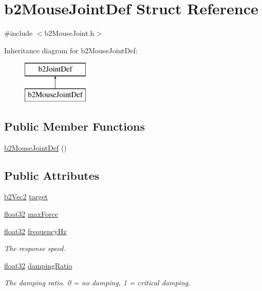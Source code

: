 \hypertarget{structb2_mouse_joint_def}{}\section{b2\+Mouse\+Joint\+Def Struct Reference}
\label{structb2_mouse_joint_def}


{\ttfamily \#include $<$b2\+Mouse\+Joint.\+h$>$}

Inheritance diagram for b2\+Mouse\+Joint\+Def\+:\begin{figure}[H]
\begin{center}
\leavevmode
\includegraphics[height=2.000000cm]{structb2_mouse_joint_def}
\end{center}
\end{figure}
\subsection*{Public Member Functions}
\begin{DoxyCompactItemize}
\item 
\mbox{\hyperlink{structb2_mouse_joint_def_ac367e7d89eadeeac53473f248f4dcdf7}{b2\+Mouse\+Joint\+Def}} ()
\end{DoxyCompactItemize}
\subsection*{Public Attributes}
\begin{DoxyCompactItemize}
\item 
\mbox{\hyperlink{structb2_vec2}{b2\+Vec2}} \mbox{\hyperlink{structb2_mouse_joint_def_aa1b76f72df9aca8d42bdc3e9922e310a}{target}}
\item 
\mbox{\hyperlink{b2_settings_8h_aacdc525d6f7bddb3ae95d5c311bd06a1}{float32}} \mbox{\hyperlink{structb2_mouse_joint_def_ae9c52b3afda8ed006eb62fad163cdc3b}{max\+Force}}
\item 
\mbox{\hyperlink{b2_settings_8h_aacdc525d6f7bddb3ae95d5c311bd06a1}{float32}} \mbox{\hyperlink{structb2_mouse_joint_def_a61e9017eb928608f75edddb6e0ca7f63}{frequency\+Hz}}
\begin{DoxyCompactList}\small\item\em The response speed. \end{DoxyCompactList}\item 
\mbox{\hyperlink{b2_settings_8h_aacdc525d6f7bddb3ae95d5c311bd06a1}{float32}} \mbox{\hyperlink{structb2_mouse_joint_def_aee42888dab204a5c5745ba61acbfb7d6}{damping\+Ratio}}
\begin{DoxyCompactList}\small\item\em The damping ratio. 0 = no damping, 1 = critical damping. \end{DoxyCompactList}\end{DoxyCompactItemize}


